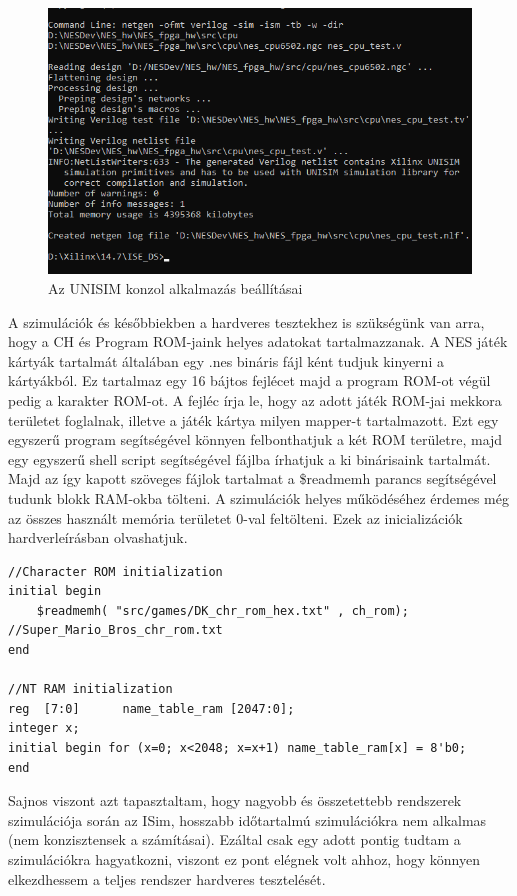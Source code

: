 \begin{figure}[H]
	\centering
	\includegraphics[width=120mm, keepaspectratio]{figures/UNISIM}
	\caption{Az UNISIM konzol alkalmazás beállításai} 
	\label{fig:UNISIM}
\end{figure}

A szimulációk és későbbiekben a hardveres tesztekhez is szükségünk van arra, hogy a CH és Program ROM-jaink helyes adatokat tartalmazzanak. A NES játék kártyák tartalmát általában egy .nes bináris fájl ként tudjuk kinyerni a kártyákból. Ez tartalmaz egy 16 bájtos fejlécet majd a program ROM-ot végül pedig a karakter ROM-ot. A fejléc írja le, hogy az adott játék ROM-jai mekkora területet foglalnak, illetve a játék kártya milyen mapper-t tartalmazott. Ezt egy egyszerű program segítségével könnyen felbonthatjuk a két ROM területre, majd egy egyszerű shell script segítségével fájlba írhatjuk a ki binárisaink tartalmát. Majd az így kapott szöveges fájlok tartalmat a \$readmemh parancs segítségével tudunk blokk RAM-okba tölteni. A szimulációk helyes működéséhez érdemes még az összes használt memória területet 0-val feltölteni. Ezek az inicializációk  hardverleírásban olvashatjuk.

\begin{lstlisting}[caption={A memória területek inicializálása a szimulációs és hardveres tesztekhez}, label={code:filling-RAM}, style=prettyverilog]
//Character ROM initialization 
initial begin
	$readmemh( "src/games/DK_chr_rom_hex.txt" , ch_rom); //Super_Mario_Bros_chr_rom.txt
end

//NT RAM initialization 
reg  [7:0] 		name_table_ram [2047:0];
integer x;
initial begin for (x=0; x<2048; x=x+1) name_table_ram[x] = 8'b0;
end\end{lstlisting}

Sajnos viszont azt tapasztaltam, hogy nagyobb és összetettebb rendszerek szimulációja során az ISim, hosszabb időtartalmú szimulációkra nem alkalmas (nem konzisztensek a számításai). Ezáltal csak egy adott pontig tudtam a szimulációkra hagyatkozni, viszont ez pont elégnek volt ahhoz, hogy könnyen elkezdhessem a teljes rendszer hardveres tesztelését.  

